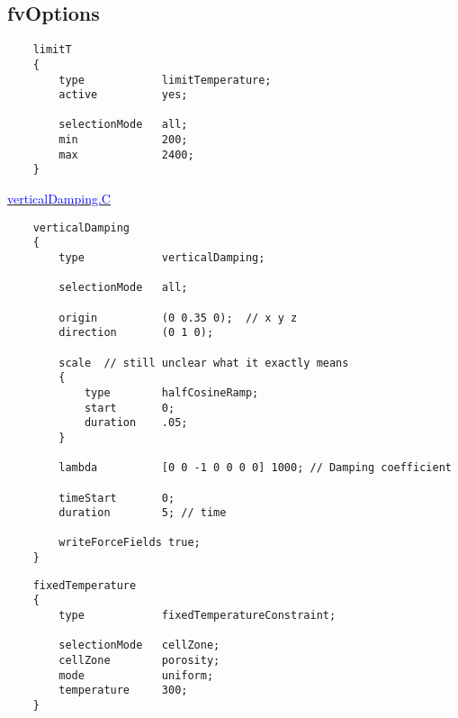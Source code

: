 \documentclass[a4paper, 12pt]{article}
\numberwithin{equation}{section}
\newcommand{\blue}[1]{\textcolor{blue}{#1}}
\begin{document}
    \subsection{fvOptions}

    \begin{minipage}{\textwidth}
    {
    \begin{verbatim}
    limitT
    {
        type            limitTemperature;
        active          yes;

        selectionMode   all;
        min             200;
        max             2400;
    }
    \end{verbatim}
    }
    \end{minipage}

    \begin{minipage}{\textwidth}
    \vspace{12pt}
    \href{
    https://github.com/OpenFOAM/OpenFOAM-12/blob/master/src/waves/fvModels/verticalDamping/verticalDamping.C
    }{\blue{verticalDamping.C}}

    {
    \begin{verbatim}
    verticalDamping
    {
        type            verticalDamping;

        selectionMode   all;

        origin          (0 0.35 0);  // x y z
        direction       (0 1 0);

        scale  // still unclear what it exactly means
        {
            type        halfCosineRamp;
            start       0;
            duration    .05;
        }

        lambda          [0 0 -1 0 0 0 0] 1000; // Damping coefficient

        timeStart       0;
        duration        5; // time

        writeForceFields true;
    }
    \end{verbatim}
    }
    \end{minipage}

    \begin{minipage}{\textwidth}
    \vspace{12pt}
    {
    \begin{verbatim}
    fixedTemperature
    {
        type            fixedTemperatureConstraint;

        selectionMode   cellZone;
        cellZone        porosity;
        mode            uniform;
        temperature     300;
    }
    \end{verbatim}
    }
    \end{minipage}
\end{document}
